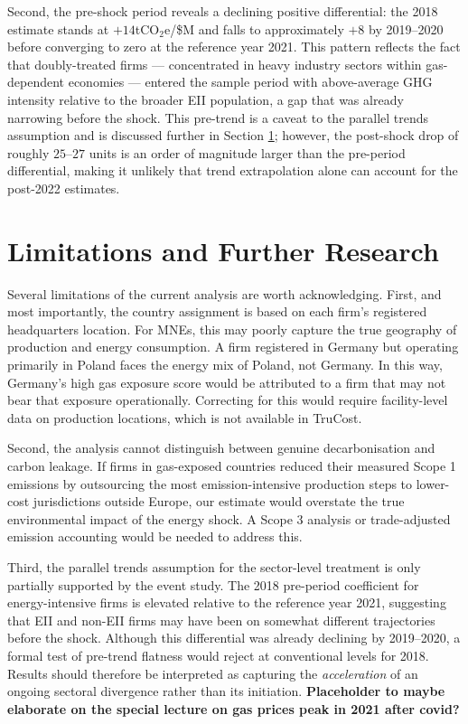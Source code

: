 \documentclass[12pt,a4paper]{article}
\begin{document}
Second, the pre-shock period reveals a declining positive differential: the 2018 estimate stands at $+14$tCO$_2$e/\$M and falls to approximately $+8$ by 2019--2020 before converging to zero at the reference year 2021. This pattern reflects the fact that doubly-treated firms --- concentrated in heavy industry sectors within gas-dependent economies --- entered the sample period with above-average GHG intensity relative to the broader EII population, a gap that was already narrowing before the shock. This pre-trend is a caveat to the parallel trends assumption and is discussed further in Section \ref{sec:limits}; however, the post-shock drop of roughly $25$--$27$ units is an order of magnitude larger than the pre-period differential, making it unlikely that trend extrapolation alone can account for the post-2022 estimates.

\section{Limitations and Further Research}
\label{sec:limits}

Several limitations of the current analysis are worth acknowledging. First, and most importantly, the country assignment is based on each firm's registered headquarters location. For MNEs, this may poorly capture the true geography of production and energy consumption. A firm registered in Germany but operating primarily in Poland faces the energy mix of Poland, not Germany. In this way, Germany's high gas exposure score would be attributed to a firm that may not bear that exposure operationally. Correcting for this would require facility-level data on production locations, which is not available in TruCost.

Second, the analysis cannot distinguish between genuine decarbonisation and carbon leakage. If firms in gas-exposed countries reduced their measured Scope 1 emissions by outsourcing the most emission-intensive production steps to lower-cost jurisdictions outside Europe, our estimate would overstate the true environmental impact of the energy shock. A Scope 3 analysis or trade-adjusted emission accounting would be needed to address this.

Third, the parallel trends assumption for the sector-level treatment is only partially supported by the event study. The 2018 pre-period coefficient for energy-intensive firms is elevated relative to the reference year 2021, suggesting that EII and non-EII firms may have been on somewhat different trajectories before the shock. Although this differential was already declining by 2019--2020, a formal test of pre-trend flatness would reject at conventional levels for 2018. Results should therefore be interpreted as capturing the \textit{acceleration} of an ongoing sectoral divergence rather than its initiation. \textbf{Placeholder to maybe elaborate on the special lecture on gas prices peak in 2021 after covid?}
\end{document}
